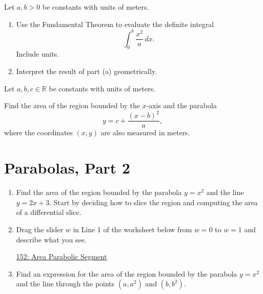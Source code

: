 \documentclass{ximera}
\begin{document}
\begin{question} \label{QOidfsfer}
Let $a,b>0$ be constants with units of meters.
\begin{enumerate}
\item Use the Fundamental Theorem to evaluate the definite integral
\[
   \int_0^b \frac{x^2}{a}\, dx . 
\]
Include units.

\item Interpret the result of part (a) geometrically.
\end{enumerate}

\end{question}

\begin{question} \label{QPERer3943}
Let $a,b,c\in \mathbb{R}$ be constants with units of meters.

Find the area of the region bounded by the $x$-axis and the parabola
\[
      y = c+ \frac{(x-b)^2}{a} ,
\]
where the coordinates $(x,y)$ are also measured in meters.
\end{question}


\section{Parabolas, Part 2}

\begin{question} \label{QKdf3rr3}
\begin{enumerate}
\item Find the area of the region bounded by the parabola $y=x^2$ and the line $y=2x+3$. Start by deciding how to slice the region and computing the area of a differential slice.

\item Drag the slider $w$ in Line 1 of the worksheet below from $w=0$ to $w=1$ and describe what you see.

\begin{onlineOnly}
    \begin{center}
\end{center}
\end{onlineOnly}

\href{https://www.desmos.com/calculator/vci24vc4f1}{152: Area Parabolic Segment}

\item Find an expression for the area of the region bounded by the parabola $y=x^2$ and the line through the points $(a,a^2)$ and $(b,b^2)$.

\end{enumerate}
\end{question}
\end{document}
